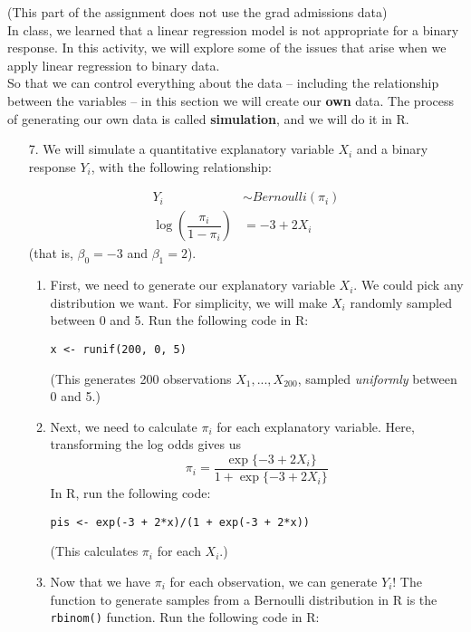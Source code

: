 \documentclass[11pt]{article}
\begin{document}
(This part of the assignment does not use the grad admissions data)\\

\noindent In class, we learned that a linear regression model is not appropriate for a binary response. In this activity, we will explore some of the issues that arise when we apply linear regression to binary data.\\

\noindent So that we can control everything about the data -- including the relationship between the variables -- in this section we will create our \textbf{own} data. The process of generating our own data is called \textbf{simulation}, and we will do it in R.\\

\begin{enumerate}
\item[7.] We will simulate a quantitative explanatory variable $X_i$ and a binary response $Y_i$, with the following relationship:

\begin{align*}
Y_i &\sim Bernoulli(\pi_i) \\
\log \left( \dfrac{\pi_i}{1 - \pi_i} \right) &= -3 + 2 X_i
\end{align*}
(that is, $\beta_0 = -3$ and $\beta_1 = 2$).

\begin{enumerate}
\item First, we need to generate our explanatory variable $X_i$. We could pick any distribution we want. For simplicity, we will make $X_i$ randomly sampled between 0 and 5. Run the following code in R:
\begin{verbatim}
x <- runif(200, 0, 5)
\end{verbatim}
(This generates 200 observations $X_1,...,X_{200}$, sampled \textit{uniformly} between 0 and 5.)

\item Next, we need to calculate $\pi_i$ for each explanatory variable. Here, transforming the log odds gives us
$$\pi_i = \dfrac{\exp\{-3 + 2 X_i\}}{1 + \exp\{-3 + 2 X_i\}}$$
In R, run the following code:

\begin{verbatim}
pis <- exp(-3 + 2*x)/(1 + exp(-3 + 2*x))
\end{verbatim}

(This calculates $\pi_i$ for each $X_i$.)

\item Now that we have $\pi_i$ for each observation, we can generate $Y_i$! The function to generate samples from a Bernoulli distribution in R is the \verb;rbinom(); function. Run the following code in R:


\end{enumerate}
\end{enumerate}
\end{document}
